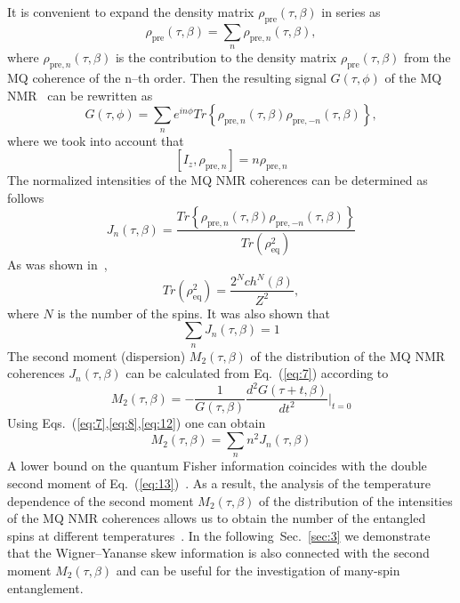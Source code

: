 \documentclass[preprint,12pt]{elsarticle}
\begin{document}
It is convenient to expand the density matrix $\rho_\mathrm{pre}(\tau, \beta)$ in series as~\cite{21}
\begin{equation}
    \label{eq:6}
        \rho_\mathrm{pre}(\tau,\beta) = \sum_n \rho_{\mathrm{pre},n}(\tau,\beta),
\end{equation}
where $\rho_{\mathrm{pre}, n}(\tau,\beta)$ is the contribution to the density matrix $\rho_\mathrm{pre}(\tau,\beta)$ from the MQ coherence of the n--th order.
Then the resulting signal $G(\tau,\phi)$ of the MQ NMR~\cite{10} can be rewritten as
\begin{equation} \label{eq:7}
    G(\tau, \phi) = \sum_n e^{in\phi}
        Tr\left\{\rho_{\mathrm{pre},n}(\tau,\beta)
        \rho_{\mathrm{pre},-n}(\tau,\beta) \right\},
\end{equation}
where we took into account that
\begin{equation}
    \label{eq:8}
        [I_z, \rho_{\mathrm{pre},n}] = n \rho_{\mathrm{pre},n}
\end{equation}
The normalized intensities of the MQ NMR coherences can be determined as follows
\begin{equation}
    \label{eq:9}
        J_n(\tau,\beta)= \frac{Tr\left\{\rho_{\mathrm{pre},n}(\tau,\beta)
            \rho_{\mathrm{pre},-n}(\tau,\beta)\right\}}
                {Tr(\rho^2_\mathrm{eq})}
\end{equation}
As was shown in~\cite{8},
\begin{equation}
    \label{eq:10}
        Tr(\rho_\mathrm{eq}^2) = \frac{2^N ch^N (\beta)}{Z^2},
\end{equation}
where $N$ is the number of the spins.
It was also shown that
\begin{equation}
    \label{eq:11}
        \sum_n J_n(\tau,\beta) = 1
\end{equation}
The second moment (dispersion) $M_2(\tau,\beta)$ of the distribution of the MQ NMR coherences $J_n (\tau,\beta)$ can be calculated from Eq.~(\ref{eq:7}) according to~\cite{22}
\begin{equation}
    \label{eq:12}
        M_2(\tau,\beta) = -\frac{1}{G(\tau, \beta)}
            \frac{d^2 G(\tau + t,\beta)}{dt^2}\bigg|
        _{t=0}
\end{equation}
Using Eqs.~(\ref{eq:7},\ref{eq:8},\ref{eq:12}) one can obtain
\begin{equation}
    \label{eq:13}
        M_2 (\tau,\beta) = \sum_n n^2 J_n(\tau,\beta)
\end{equation}
A lower bound on the quantum Fisher information coincides with the double second moment of Eq.~(\ref{eq:13})~\cite{7,9}.
As a result, the analysis of the temperature dependence of the second moment $M_2(\tau,\beta)$ of the distribution of the intensities of the MQ NMR coherences allows us to obtain the number of the entangled spins at different temperatures~\cite{8}.
In the following~Sec.~\ref{sec:3} we demonstrate that the Wigner--Yananse skew information is also connected with the second moment $M_2(\tau,\beta)$
and can be useful for the investigation of many-spin entanglement.
\end{document}
